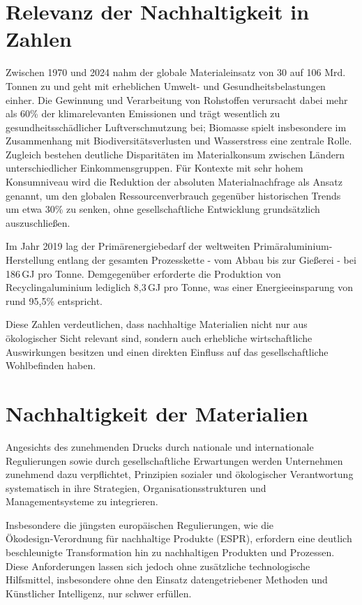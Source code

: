 \section{Relevanz der Nachhaltigkeit in Zahlen}

Zwischen 1970 und 2024 nahm der globale Materialeinsatz von 30 auf 106 Mrd. Tonnen zu und geht mit erheblichen Umwelt- und Gesundheitsbelastungen einher. Die Gewinnung und Verarbeitung von Rohstoffen verursacht dabei mehr als 60\% der klimarelevanten Emissionen und trägt wesentlich zu gesundheitsschädlicher Luftverschmutzung bei; Biomasse spielt insbesondere im Zusammenhang mit Biodiversitätsverlusten und Wasserstress eine zentrale Rolle. Zugleich bestehen deutliche Disparitäten im Materialkonsum zwischen Ländern unterschiedlicher Einkommensgruppen. Für Kontexte mit sehr hohem Konsumniveau wird die Reduktion der absoluten Materialnachfrage als Ansatz genannt, um den globalen Ressourcenverbrauch gegenüber historischen Trends um etwa 30\% zu senken, ohne gesellschaftliche Entwicklung grundsätzlich auszuschließen. \cite{IRP2024_GlobalResourcesOutlook_PressRelease}


Im Jahr 2019 lag der Primärenergiebedarf der weltweiten Primäraluminium-Herstellung entlang der gesamten Prozesskette - vom Abbau bis zur Gießerei - bei 186\,GJ pro Tonne. Demgegenüber erforderte die Produktion von Recyclingaluminium lediglich 8,3\,GJ pro Tonne, was einer Energieeinsparung von rund 95,5\% entspricht. \cite{EuropeanAluminium2025_EnvironmentalProfileReport2024_V2}

Diese Zahlen verdeutlichen, dass nachhaltige Materialien nicht nur aus ökologischer Sicht relevant sind, sondern auch erhebliche wirtschaftliche Auswirkungen besitzen und einen direkten Einfluss auf das gesellschaftliche Wohlbefinden haben.

\section{Nachhaltigkeit der Materialien}
Angesichts des zunehmenden Drucks durch nationale und internationale Regulierungen sowie durch gesellschaftliche Erwartungen werden Unternehmen zunehmend dazu verpflichtet, Prinzipien sozialer und ökologischer Verantwortung systematisch in ihre Strategien, Organisationsstrukturen und Managementsysteme zu integrieren. \cite{gond2012configuring}

Insbesondere die jüngsten europäischen Regulierungen, wie die Ökodesign‑Verordnung für nachhaltige Produkte (ESPR), erfordern eine deutlich beschleunigte Transformation hin zu nachhaltigen Produkten und Prozessen. Diese Anforderungen lassen sich jedoch ohne zusätzliche technologische Hilfsmittel, insbesondere ohne den Einsatz datengetriebener Methoden und Künstlicher Intelligenz, nur schwer erfüllen. \cite{faraca2024ecodesign}


